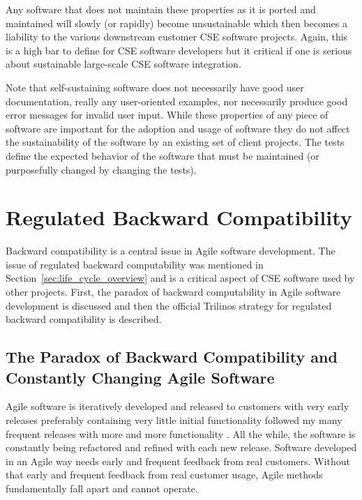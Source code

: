 \documentclass[11pt]{SANDreport}
\begin{document}
Any software that does not maintain these properties as it is ported
and maintained will slowly (or rapidly) become unsustainable which
then becomes a liability to the various downstream customer CSE
software projects.  Again, this is a high bar to define for CSE
software developers but it critical if one is serious about
sustainable large-scale CSE software integration.

Note that self-sustaining software does not necessarily have good user
documentation, really any user-oriented examples, nor necessarily
produce good error messages for invalid user input.  While these
properties of any piece of software are important for the adoption and
usage of software they do not affect the sustainability of the software
by an existing set of client projects.  The tests define the expected
behavior of the software that must be maintained (or purposefully
changed by changing the tests).


%
{}\section{Regulated Backward Compatibility}
\label{sec:regulated_backard_compatibility}
%

Backward compatibility is a central issue in Agile software
development.  The issue of regulated backward computability was
mentioned in Section~\ref{sec:life_cycle_overview} and is a critical
aspect of CSE software used by other projects.  First, the paradox of
backward computability in Agile software development is discussed and
then the official Trilinos strategy for regulated backward
compatibility is described.


%
{}\subsection{The Paradox of Backward Compatibility and Constantly
Changing Agile Software}
\label{sec:paradox_of_back_compat_agile}
%

Agile software is iteratively developed and released to customers with
very early releases preferably containing very little initial
functionality followed my many frequent releases with more and more
functionality {}\cite{AgileSoftwareDevelopment}.  All the while, the
software is constantly being refactored and refined with each new
release.  Software developed in an Agile way needs early and frequent
feedback from real customers.  Without that early and frequent
feedback from real customer usage, Agile methods fundamentally fall
apart and cannot operate.
\end{document}
